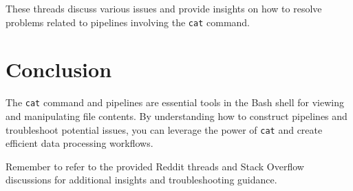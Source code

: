 \documentclass{article}
\begin{document}
These threads discuss various issues and provide insights on how to resolve problems related to pipelines involving the \texttt{cat} command.

\section{Conclusion}

The \texttt{cat} command and pipelines are essential tools in the Bash shell for viewing and manipulating file contents. By understanding how to construct pipelines and troubleshoot potential issues, you can leverage the power of \texttt{cat} and create efficient data processing workflows.

Remember to refer to the provided Reddit threads and Stack Overflow discussions for additional insights and troubleshooting guidance.
\end{document}
